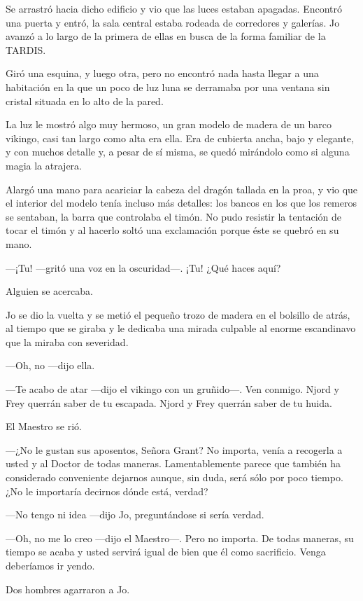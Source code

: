 Se arrastró hacia dicho edificio y vio que las luces estaban apagadas.
Encontró una puerta y entró, la sala central estaba rodeada de
corredores y galerías. Jo avanzó a lo largo de la primera de ellas en
busca de la forma familiar de la TARDIS.

Giró una esquina, y luego otra, pero no encontró nada hasta llegar a una
habitación en la que un poco de luz luna se derramaba por una ventana
sin cristal situada en lo alto de la pared.

La luz le mostró algo muy hermoso, un gran modelo de madera de un barco
vikingo, casi tan largo como alta era ella. Era de cubierta ancha, bajo
y elegante, y con muchos detalle y, a pesar de sí misma, se quedó
mirándolo como si alguna magia la atrajera.

Alargó una mano para acariciar la cabeza del dragón tallada en la proa,
y vio que el interior del modelo tenía incluso más detalles: los bancos
en los que los remeros se sentaban, la barra que controlaba el timón. No
pudo resistir la tentación de tocar el timón y al hacerlo soltó una
exclamación porque éste se quebró en su mano.

---¡Tu! ---gritó una voz en la oscuridad---. ¡Tu! ¿Qué haces aquí?

Alguien se acercaba.

Jo se dio la vuelta y se metió el pequeño trozo de madera en el bolsillo
de atrás, al tiempo que se giraba y le dedicaba una mirada culpable al
enorme escandinavo que la miraba con severidad.

---Oh, no ---dijo ella.

---Te acabo de atar ---dijo el vikingo con un gruñido---. Ven conmigo.
Njord y Frey querrán saber de tu escapada. Njord y Frey querrán saber de
tu huida.

El Maestro se rió.

---¿No le gustan sus aposentos, Señora Grant? No importa, venía a
recogerla a usted y al Doctor de todas maneras. Lamentablemente parece
que también ha considerado conveniente dejarnos aunque, sin duda, será
sólo por poco tiempo. ¿No le importaría decirnos dónde está, verdad?

---No tengo ni idea ---dijo Jo, preguntándose si sería verdad.

---Oh, no me lo creo ---dijo el Maestro---. Pero no importa. De todas
maneras, su tiempo se acaba y usted servirá igual de bien que él como
sacrificio. Venga deberíamos ir yendo.

Dos hombres agarraron a Jo.


